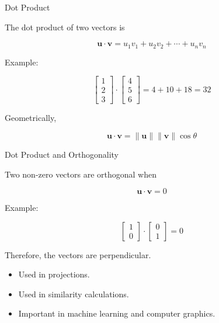 \documentclass[aspectratio=169]{beamer}
\begin{document}
\begin{frame}{Dot Product}
\small

The dot product of two vectors is

$$
\mathbf{u}\cdot\mathbf{v}
=
u_1v_1+u_2v_2+\cdots+u_nv_n
$$

Example:

$$
\begin{bmatrix}
1\\
2\\
3
\end{bmatrix}
\cdot
\begin{bmatrix}
4\\
5\\
6
\end{bmatrix}
=
4+10+18=32
$$

Geometrically,

$$
\mathbf{u}\cdot\mathbf{v}
=
\|\mathbf{u}\|\|\mathbf{v}\|\cos\theta
$$

\end{frame}

\begin{frame}{Dot Product and Orthogonality}
\small

Two non-zero vectors are orthogonal when

$$
\mathbf{u}\cdot\mathbf{v}=0
$$

Example:

$$
\begin{bmatrix}
1\\
0
\end{bmatrix}
\cdot
\begin{bmatrix}
0\\
1
\end{bmatrix}
=0
$$

Therefore, the vectors are perpendicular.

\begin{itemize}
\item Used in projections.
\item Used in similarity calculations.
\item Important in machine learning and computer graphics.
\end{itemize}

\end{frame}
\end{document}
